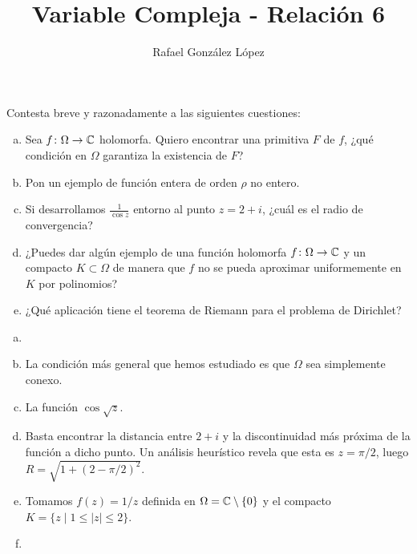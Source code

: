 \documentclass[twoside]{article}
\begin{document}
\title{Variable Compleja - Relación 6}
\author{Rafael González López}
\maketitle


\begin{ejercicio}{1}
Contesta breve y razonadamente a las siguientes cuestiones:
\begin{enumerate}[a)]
\item Sea $f\colon\Omega\to \mathbb{C}$ holomorfa. Quiero encontrar una primitiva $F$ de $f$, ¿qué condición en $\Omega$ garantiza la existencia de $F$?
\item Pon un ejemplo de función entera  de orden $\rho$ no entero. 
\item Si desarrollamos $\frac{1}{\cos z}$ entorno al punto $z=2+i$, ¿cuál es el radio de convergencia?
\item ¿Puedes dar algún ejemplo de una función holomorfa $f\colon\Omega\to\mathbb{C}$ y un compacto 
$K\subset\Omega$ de manera que $f$ no se pueda aproximar uniformemente en $K$ por polinomios?
\item ¿Qué aplicación tiene el teorema de Riemann para el problema de Dirichlet?
\end{enumerate}
\end{ejercicio}
\begin{solucion}
\begin{enumerate}[a)]
\item[]
\item La condición más general que hemos estudiado es que $\Omega$ sea simplemente conexo.
\item La función $\cos \sqrt{z}$.
\item Basta encontrar la distancia entre $2+i$ y la discontinuidad más próxima de la función a dicho punto. Un análisis heurístico revela que esta es $z=\pi/2$, luego $R=\sqrt{1 + (2 - \pi/2)^2}$.
\item Tomamos $f(z)=1/z$ definida en $\Omega = \mathbb{C}\setminus\{0\}$ y el compacto $K=\{z\mid 1\leq |z|\leq 2\}$.
\item 
\end{enumerate}
\end{solucion}
\end{document}
